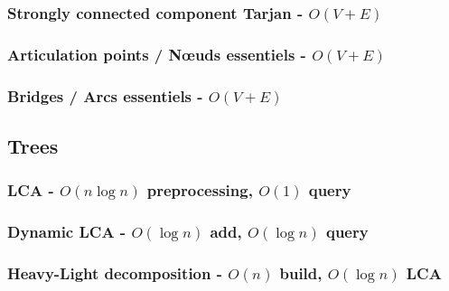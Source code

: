 \documentclass[landscape,a4paper,twocolumn,10pt]{report}
\begin{document}
\subsubsection{Strongly connected component Tarjan - $O(V + E)$}


%

\subsubsection{Articulation points / N\oe uds essentiels - $O(V + E)$}


\subsubsection{Bridges / Arcs essentiels - $O(V + E)$}


\subsection*{Trees}
\label{trees}

\subsubsection{LCA - $O(n \log n)$ preprocessing, $O(1)$ query}


\subsubsection{Dynamic LCA - $O(\log n)$ add, $O(\log n)$ query}


\subsubsection{Heavy-Light decomposition - $O(n)$ build, $O(\log n)$ LCA}

\end{document}
